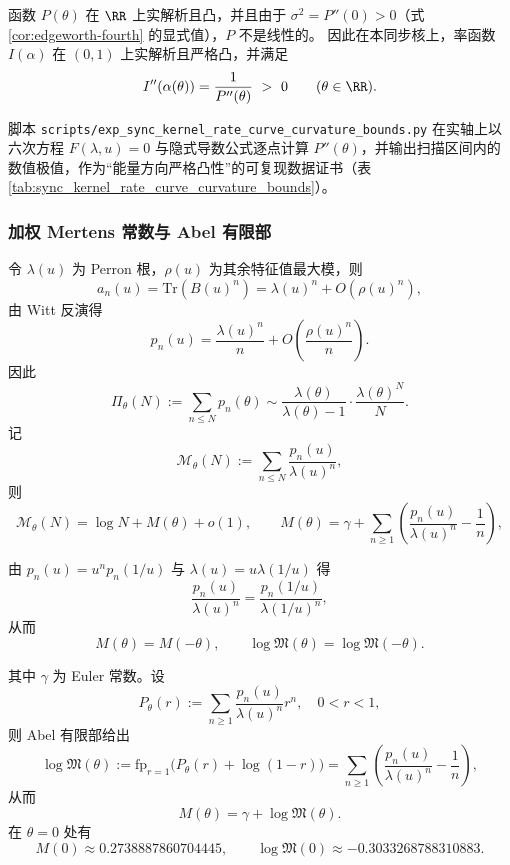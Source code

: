 \begin{proposition}\label{prop:rate-strict-convex}
函数 \(P(\theta)\) 在 \(\RR\) 上实解析且凸，并且由于 \(\sigma^2=P''(0)>0\)（式 \eqref{cor:edgeworth-fourth} 的显式值），\(P\) 不是线性的。
因此在本同步核上，率函数 \(I(\alpha)\) 在 \((0,1)\) 上实解析且严格凸，并满足
\[
I''(\alpha(\theta))=\frac{1}{P''(\theta)}\ >\ 0\qquad(\theta\in\RR).
\]
\end{proposition}
\begin{remark}\label{rem:rate-curvature-bounds}
脚本 \texttt{scripts/exp\_sync\_kernel\_rate\_curve\_curvature\_bounds.py} 在实轴上以六次方程 \(F(\lambda,u)=0\) 与隐式导数公式逐点计算 \(P''(\theta)\)，并输出扫描区间内的数值极值，作为“能量方向严格凸性”的可复现数据证书（表 \ref{tab:sync_kernel_rate_curve_curvature_bounds}）。
\end{remark}


\subsubsection{加权 Mertens 常数与 Abel 有限部}\label{app:mertens-weighted}
令 $\lambda(u)$ 为 Perron 根，$\rho(u)$ 为其余特征值最大模，则
\[
a_n(u)=\mathrm{Tr}(B(u)^n)=\lambda(u)^n+O(\rho(u)^n),
\]
由 Witt 反演得
\[
p_n(u)=\frac{\lambda(u)^n}{n}+O\!\left(\frac{\rho(u)^n}{n}\right).
\]
因此
\[
\Pi_\theta(N):=\sum_{n\le N}p_n(\theta)\sim \frac{\lambda(\theta)}{\lambda(\theta)-1}\cdot\frac{\lambda(\theta)^N}{N}.
\]
记
\[
\mathcal{M}_\theta(N):=\sum_{n\le N}\frac{p_n(u)}{\lambda(u)^n},
\]
则
\[
\mathcal{M}_\theta(N)=\log N+M(\theta)+o(1),
\qquad
M(\theta)=\gamma+\sum_{n\ge 1}\left(\frac{p_n(u)}{\lambda(u)^n}-\frac{1}{n}\right),
\]

\begin{proposition}\label{prop:mertens-even}
由 $p_n(u)=u^n p_n(1/u)$ 与 $\lambda(u)=u\lambda(1/u)$ 得
\[
\frac{p_n(u)}{\lambda(u)^n}=\frac{p_n(1/u)}{\lambda(1/u)^n},
\]
从而
\[
M(\theta)=M(-\theta),\qquad
\log\mathfrak{M}(\theta)=\log\mathfrak{M}(-\theta).
\]
\end{proposition}
其中 $\gamma$ 为 Euler 常数。设
\[
P_\theta(r):=\sum_{n\ge 1}\frac{p_n(u)}{\lambda(u)^n}r^n,\quad 0<r<1,
\]
则 Abel 有限部给出
\[
\log\mathfrak{M}(\theta):=\mathrm{fp}_{r=1}\bigl(P_\theta(r)+\log(1-r)\bigr)
=\sum_{n\ge 1}\left(\frac{p_n(u)}{\lambda(u)^n}-\frac{1}{n}\right),
\]
从而
\[
M(\theta)=\gamma+\log\mathfrak{M}(\theta).
\]
在 $\theta=0$ 处有
\[
M(0)\approx 0.2738887860704445,\qquad
\log\mathfrak{M}(0)\approx -0.3033268788310883.
\]

